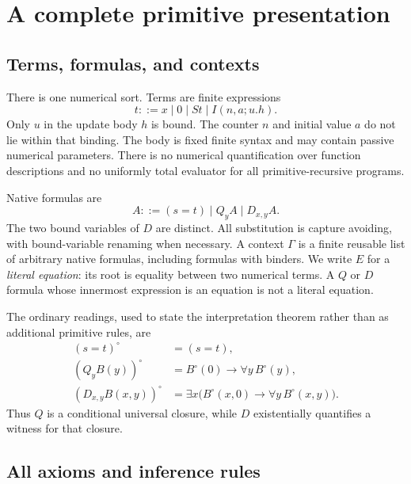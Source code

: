 \documentclass[11pt]{article}
\theoremstyle{definition}
\begin{document}
\section{A complete primitive presentation}
\label{sec:calculus}

\subsection{Terms, formulas, and contexts}

There is one numerical sort. Terms are finite expressions
\[
 t ::= x\mid 0\mid St\mid I(n,a;u.h).
\]
Only $u$ in the update body $h$ is bound. The counter $n$ and initial value
$a$ do not lie within that binding. The body is fixed finite syntax and may
contain passive numerical parameters. There is no numerical quantification
over function descriptions and no uniformly total evaluator for all
primitive-recursive programs.

Native formulas are
\[
 A ::= (s=t)\mid Q_y A\mid D_{x,y}A.
\]
The two bound variables of $D$ are distinct. All substitution is capture
avoiding, with bound-variable renaming when necessary. A context $\Gamma$ is
a finite reusable list of arbitrary native formulas, including formulas with
binders. We write $E$ for a \emph{literal equation}: its root is equality
between two numerical terms. A $Q$ or $D$ formula whose innermost expression
is an equation is not a literal equation.

The ordinary readings, used to state the interpretation theorem rather than
as additional primitive rules, are
\begin{align}
 (s=t)^\circ&=(s=t),\label{eq:read-eq}\\
 (Q_yB(y))^\circ&=B^\circ(0)\to\forall y\,B^\circ(y),\label{eq:read-q}\\
 (D_{x,y}B(x,y))^\circ
   &=\exists x\bigl(B^\circ(x,0)\to\forall y\,B^\circ(x,y)\bigr).
   \label{eq:read-d}
\end{align}
Thus $Q$ is a conditional universal closure, while $D$ existentially
quantifies a witness for that closure.

\subsection{All axioms and inference rules}
\end{document}
